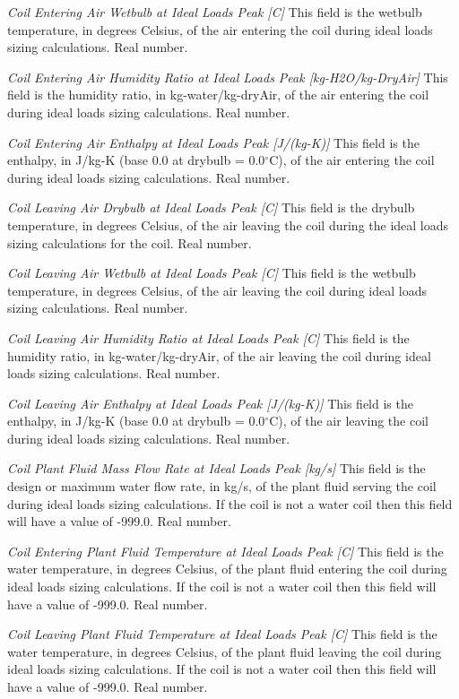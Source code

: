 \emph{Coil Entering Air Wetbulb at Ideal Loads Peak [C]}  This field is the wetbulb temperature, in degrees Celsius, of the air entering the coil during ideal loads sizing calculations.  Real number.

\emph{Coil Entering Air Humidity Ratio at Ideal Loads Peak [kg-H2O/kg-DryAir]}  This field is the humidity ratio, in kg-water/kg-dryAir, of the air entering the coil during ideal loads sizing calculations. Real number.

\emph{Coil Entering Air Enthalpy at Ideal Loads Peak [J/(kg-K)]}  This field is the enthalpy, in J/kg-K (base 0.0 at drybulb = 0.0$^\circ$C), of the air entering the coil during ideal loads sizing calculations. Real number.

\emph{Coil Leaving Air Drybulb at Ideal Loads Peak [C]}  This field is the drybulb temperature, in degrees Celsius, of the air leaving the coil during the ideal loads sizing calculations for the coil.  Real number.

\emph{Coil Leaving Air Wetbulb at Ideal Loads Peak [C]}  This field is the wetbulb temperature, in degrees Celsius, of the air leaving the coil during ideal loads sizing calculations. Real number.

\emph{Coil Leaving Air Humidity Ratio at Ideal Loads Peak [C]}  This field is the humidity ratio, in kg-water/kg-dryAir, of the air leaving the coil during ideal loads sizing calculations. Real number.

\emph{Coil Leaving Air Enthalpy at Ideal Loads Peak [J/(kg-K)]}  This field is the enthalpy, in J/kg-K (base 0.0 at drybulb = 0.0$^\circ$C), of the air leaving the coil during ideal loads sizing calculations. Real number.

\emph{Coil Plant Fluid Mass Flow Rate at Ideal Loads Peak [kg/s]}  This field is the design or maximum water flow rate, in kg/s, of the plant fluid serving the coil during ideal loads sizing calculations.  If the coil is not a water coil then this field will have a value of -999.0. Real number.

\emph{Coil Entering Plant Fluid Temperature at Ideal Loads Peak [C]}  This field is the water temperature, in degrees Celsius, of the plant fluid entering the coil during ideal loads sizing calculations.  If the coil is not a water coil then this field will have a value of -999.0. Real number.

\emph{Coil Leaving Plant Fluid Temperature at Ideal Loads Peak [C]}  This field is the water temperature, in degrees Celsius, of the plant fluid leaving the coil during ideal loads sizing calculations.  If the coil is not a water coil then this field will have a value of -999.0. Real number.


